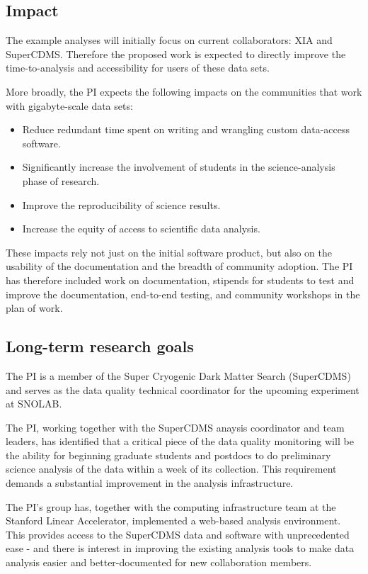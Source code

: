 \subsection{Impact}
The example analyses will initially focus on current collaborators: XIA and SuperCDMS.  Therefore the proposed work is expected to directly improve the time-to-analysis and accessibility for users of these data sets.

More broadly, the PI expects the following impacts on the communities that work with gigabyte-scale data sets:

\begin{itemize}
    \item Reduce redundant time spent on writing and wrangling custom data-access software.
    \item Significantly increase the involvement of students in the science-analysis phase of research.
    \item Improve the reproducibility of science results. 
    \item Increase the equity of access to scientific data analysis.
\end{itemize}

These impacts rely not just on the initial software product, but also on the usability of the documentation and the breadth of community adoption.  The PI has therefore included work on documentation, stipends for students to test and improve the documentation, end-to-end testing, and community workshops in the plan of work.

\subsection{Long-term research goals}
The PI is a member of the Super Cryogenic Dark Matter Search (SuperCDMS) and serves as the data quality technical coordinator for the upcoming experiment at SNOLAB.

The PI, working together with the SuperCDMS anaysis coordinator and team leaders, has identified that a critical piece of the data quality monitoring will be the ability for beginning graduate students and postdocs to do preliminary science analysis of the data within a week of its collection.  This requirement demands a substantial improvement in the analysis infrastructure.

The PI's group has, together with the computing infrastructure team at the Stanford Linear Accelerator, implemented a web-based analysis environment.  This provides access to the SuperCDMS data and software with unprecedented ease - and there is interest in improving the existing analysis tools to make data analysis easier and better-documented for new collaboration members. 

